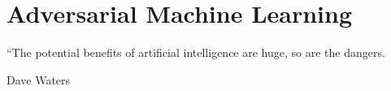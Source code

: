 \section{Adversarial Machine Learning}

\epigraph{“The potential benefits of artificial intelligence are huge, so are the dangers.}{Dave Waters}



